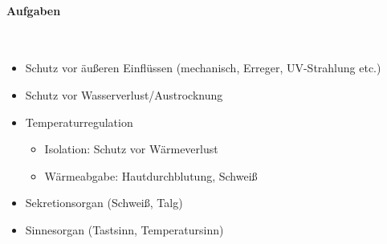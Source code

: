 \paragraph{Aufgaben}~

\begin{itemize}
    \item Schutz vor äußeren Einflüssen (mechanisch, Erreger,
    UV-Strahlung etc.)
    \item Schutz vor Wasserverlust/Austrocknung
    \item Temperaturregulation 
    \begin{itemize}
        \item Isolation: Schutz vor Wärmeverlust 
        \item Wärmeabgabe: Hautdurchblutung, Schweiß
\end{itemize}
    \item Sekretionsorgan (Schweiß, Talg)
    \item Sinnesorgan (Tastsinn, Temperatursinn)
\end{itemize}

